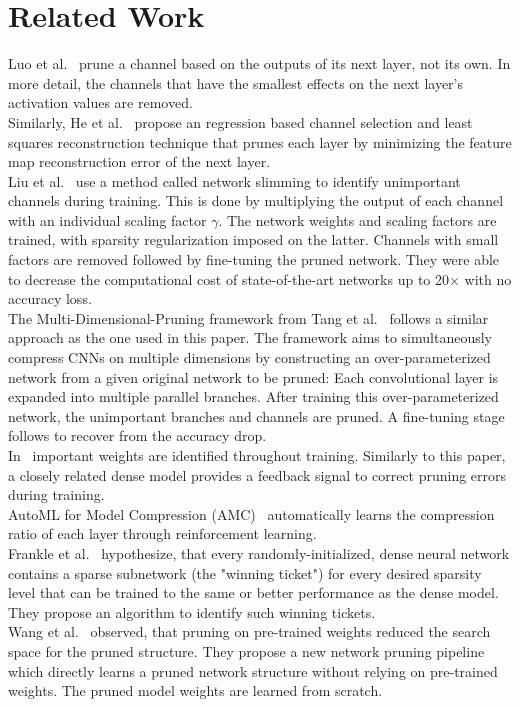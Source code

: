 \documentclass[10pt,twocolumn,letterpaper]{article}
\begin{document}
\section{Related Work}\label{sec:related_work}
Luo et al.~\cite{Luo2017} prune a channel based on the outputs of its next layer, not its own.
In more detail, the channels that have the smallest effects on the next layer's activation values are removed.\\
Similarly, He et al.~\cite{He2017} propose an regression based channel selection and least squares reconstruction technique that prunes each layer by minimizing the feature map reconstruction error of the next layer.\\
Liu et al.~\cite{Liu2017} use a method called network slimming to identify unimportant channels during training.
This is done by multiplying the output of each channel with an individual scaling factor $\gamma$.
The network weights and scaling factors are trained, with sparsity regularization imposed on the latter.
Channels with small factors are removed followed by fine-tuning the pruned network.
They were able to decrease the computational cost of state-of-the-art networks up to 20$\times$ with no accuracy loss.\\
The Multi-Dimensional-Pruning framework from Tang et al.~\cite{Tang2018} follows a similar approach as the one used in this paper.
The framework aims to simultaneously compress CNNs on multiple dimensions by constructing an over-parameterized network from a given original network to be pruned:
Each convolutional layer is expanded into multiple parallel branches.
After training this over-parameterized network, the unimportant branches and channels are pruned.
A fine-tuning stage follows to recover from the accuracy drop.\\
In~\cite{Lin2020} important weights are identified throughout training.
Similarly to this paper, a closely related dense model provides a feedback signal to correct pruning errors during training.\\
AutoML for Model Compression (AMC)~\cite{He2018} automatically learns the compression ratio of each layer through reinforcement learning.\\
Frankle et al.~\cite{Frankle2018} hypothesize, that every randomly-initialized, dense neural network contains a sparse subnetwork (the "winning ticket") for every desired sparsity level that can be trained to the same or better performance as the dense model.
They propose an algorithm to identify such winning tickets.\\
Wang et al.~\cite{Wang2019} observed, that pruning on pre-trained weights reduced the search space for the pruned structure.
They propose a new network pruning pipeline which directly learns a pruned network structure without relying on pre-trained weights.
The pruned model weights are learned from scratch.
\end{document}
